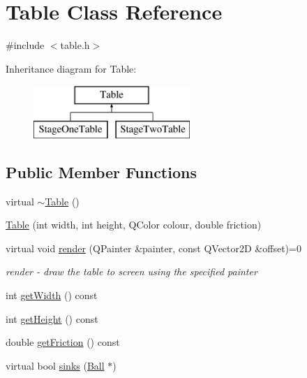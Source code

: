 \hypertarget{class_table}{}\section{Table Class Reference}
\label{class_table}


{\ttfamily \#include $<$table.\+h$>$}

Inheritance diagram for Table\+:\begin{figure}[H]
\begin{center}
\leavevmode
\includegraphics[height=2.000000cm]{class_table}
\end{center}
\end{figure}
\subsection*{Public Member Functions}
\begin{DoxyCompactItemize}
\item 
virtual \mbox{\hyperlink{class_table_ac7541d139723d710fb7c39b1898d6e87}{$\sim$\+Table}} ()
\item 
\mbox{\hyperlink{class_table_a7f7c9dbfd3a6ebf5360cfd30e6d9ceb6}{Table}} (int width, int height, Q\+Color colour, double friction)
\item 
virtual void \mbox{\hyperlink{class_table_a827dac18920a95b3e0ef006183514654}{render}} (Q\+Painter \&painter, const Q\+Vector2D \&offset)=0
\begin{DoxyCompactList}\small\item\em render -\/ draw the table to screen using the specified painter \end{DoxyCompactList}\item 
int \mbox{\hyperlink{class_table_a767798fbd671c4c6805091a116439444}{get\+Width}} () const
\item 
int \mbox{\hyperlink{class_table_a3c40550751e65b563b3f1759bd12985c}{get\+Height}} () const
\item 
double \mbox{\hyperlink{class_table_a250960dffeb3fa744bf098a49ef78d8a}{get\+Friction}} () const
\item 
virtual bool \mbox{\hyperlink{class_table_ab3eb192b2a06e26349d651e4e6de063a}{sinks}} (\mbox{\hyperlink{class_ball}{Ball}} $\ast$)
\end{DoxyCompactItemize}
